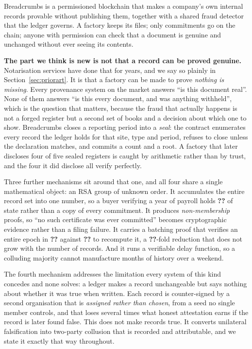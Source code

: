 \documentclass[11pt,a4paper]{article}
\providecommand{\num}[1]{\textbf{??}}%
\providecommand{\numunit}[2]{\textbf{??}}%
\begin{document}
Breadcrumbs is a permissioned blockchain that makes a company's own internal
records provable without publishing them, together with a shared fraud detector
that the ledger governs. A factory keeps its files; only commitments go on the
chain; anyone with permission can check that a document is genuine and unchanged
without ever seeing its contents.

\textbf{The part we think is new is not that a record can be proved genuine.}
Notarisation services have done that for years, and we say so plainly in
Section~\ref{sec:priorart}. It is that a factory can be made to prove
\emph{nothing is missing}. Every provenance system on the market answers ``is
this document real''. None of them answers ``is this every document, and was
anything withheld'', which is the question that matters, because the fraud that
actually happens is not a forged register but a second set of books and a
decision about which one to show. Breadcrumbs closes a reporting period into a
\emph{seal}: the contract enumerates every record the ledger holds for that site,
type and period, refuses to close unless the declaration matches, and commits a
count and a root. A factory that later discloses four of five sealed registers is
caught by arithmetic rather than by trust, and the four it did disclose all
verify perfectly.

Three further mechanisms sit around that one, and all four share a single
mathematical object: an RSA group of unknown order. It accumulates the entire
record set into one number, so a buyer verifying a year of payroll holds
\numunit{AccumulatorAccumulatorStateBytes}{bytes} of state rather than a copy of
every commitment. It produces \emph{non-membership} proofs, so ``no such
certificate was ever committed'' becomes cryptographic evidence rather than a
filing failure. It carries a batching proof that verifies an entire epoch in
\numunit{AccumulatorEpochProofMs}{ms}
against \numunit{AccumulatorEpochRecomputeMs}{ms} to recompute
it, a \num{AccumulatorEpochProofSpeedup}-fold reduction that does not grow with
the number of records. And it runs a verifiable delay function, so a colluding
majority cannot manufacture months of history over a weekend.

The fourth mechanism addresses the limitation every system of this kind concedes
and none solves: a ledger makes a record unchangeable but says nothing about
whether it was true when written. Each record is counter-signed by a second
organisation that is \emph{assigned rather than chosen}, from a seed no single
member controls, and that loses several times what honest attestation earns if
the record is later found false. This does not make records true. It converts
unilateral falsification into two-party collusion that is recorded and
attributable, and we state it exactly that way throughout.
\end{document}
